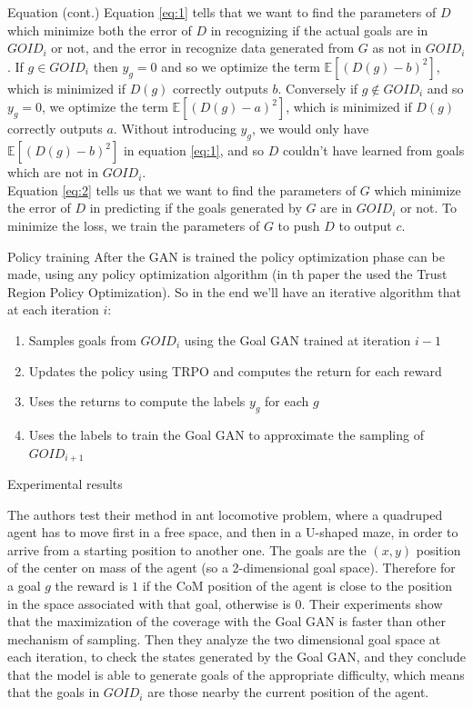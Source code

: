 \documentclass{beamer}
\begin{document}
	\begin{frame}{Equation (cont.)}
		Equation \ref{eq:1} tells that we want to find the parameters of $D$ which minimize both the error of $D$ in recognizing if the actual goals are in $GOID_i$ or not, and the error in recognize data generated from $G$ as not in $GOID_i$. If $g \in GOID_i$ then $y_g = 0$ and so we optimize the term $\mathbb{E}[(D(g)-b)^2]$, which is minimized if $D(g)$ correctly outputs $b$. Conversely if $g \not \in GOID_i$ and so $y_g = 0$, we optimize the term $\mathbb{E}[(D(g)-a)^2]$, which is minimized if $D(g)$ correctly outputs $a$. Without introducing $y_g$, we would only have $\mathbb{E}[(D(g)-b)^2]$ in equation \ref{eq:1}, and so $D$ couldn't have learned from goals which are not in $GOID_i$.\\
		Equation \ref{eq:2} tells us that we want to find the parameters of $G$ which minimize the error of $D$ in predicting if the goals generated by $G$ are in $GOID_i$ or not. To minimize the loss, we train the parameters of $G$ to push $D$ to output $c$.
	\end{frame}

	\begin{frame}{Policy training}
		After the GAN is trained the policy optimization phase can be made, using any policy optimization algorithm (in th paper the used the Trust Region Policy Optimization). So in the end we'll have an iterative algorithm that at each iteration $i$:
		\begin{enumerate}
			\item Samples goals from $GOID_i$ using the Goal GAN trained at iteration $i-1$
			\item Updates the policy using TRPO and computes the return for each reward
			\item Uses the returns to compute the labels $y_g$ for each $g$
			\item Uses the labels to train the Goal GAN to approximate the sampling of $GOID_{i+1}$
		\end{enumerate}
	\end{frame}

	\begin{frame}{Experimental results}
		
		The authors test their method in ant locomotive problem, where a quadruped agent has to move first in a free space, and then in a U-shaped maze, in order to arrive from a starting position to another one. The goals are the $(x,y)$ position of the center on mass of the agent (so a 2-dimensional goal space). Therefore for a goal $g$ the reward is $1$ if the CoM position of the agent is close to the position in the space associated with that goal, otherwise is 0. Their experiments show that the maximization of the coverage with the Goal GAN is faster than other mechanism of sampling. Then they analyze the two dimensional goal space at each iteration, to check the states generated by the Goal GAN, and they conclude that the model is able to generate goals of the appropriate difficulty, which means that the goals in $GOID_i$ are those nearby the current position of the agent. 
	\end{frame}
\end{document}
